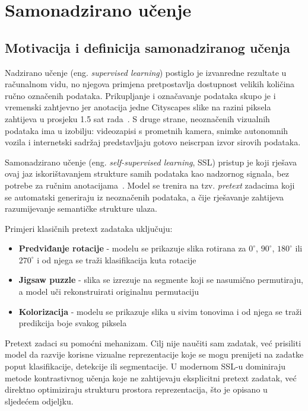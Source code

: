 \documentclass[diplomskirad]{fer}
\begin{document}
\section{Samonadzirano učenje}
\label{sec:ssl}

\subsection{Motivacija i definicija samonadziranog učenja}

Nadzirano učenje (eng. \textit{supervised learning}) postiglo je izvanredne rezultate u računalnom vidu, no njegova primjena pretpostavlja dostupnost velikih količina ručno označenih podataka. Prikupljanje i označavanje podataka skupo je i vremenski zahtjevno jer anotacija jedne Cityscapes slike na razini piksela zahtijeva u prosjeku 1.5 sat rada~\cite{cordts2016cityscapes}. S druge strane, neoznačenih vizualnih podataka ima u izobilju: videozapisi s prometnih kamera, snimke autonomnih vozila i internetski sadržaj predstavljaju gotovo neiscrpan izvor sirovih podataka.

Samonadzirano učenje (eng. \textit{self-supervised learning}, SSL) pristup je koji rješava ovaj jaz iskorištavanjem strukture samih podataka kao nadzornog signala, bez potrebe za ručnim anotacijama~\cite{goodfellow2016deep}. Model se trenira na tzv. \textit{pretext} zadacima koji se automatski generiraju iz neoznačenih podataka, a čije rješavanje zahtijeva razumijevanje semantičke strukture ulaza.

Primjeri klasičnih pretext zadataka uključuju:
\begin{itemize}
	\item \textbf{Predviđanje rotacije} - modelu se prikazuje slika rotirana za $0^{\circ}$, $90^{\circ}$, $180^{\circ}$ ili $270^{\circ}$ i od njega se traži klasifikacija kuta rotacije~\cite{goodfellow2016deep}
	\item \textbf{Jigsaw puzzle} - slika se izrezuje na segmente koji se nasumično permutiraju, a model uči rekonstruirati originalnu permutaciju
	\item \textbf{Kolorizacija} - modelu se prikazuje slika u sivim tonovima i od njega se traži predikcija boje svakog piksela
\end{itemize}

Pretext zadaci su pomoćni mehanizam. Cilj nije naučiti sam zadatak, već prisiliti model da razvije korisne vizualne reprezentacije koje se mogu prenijeti na zadatke poput klasifikacije, detekcije ili segmentacije. U modernom SSL-u dominiraju metode kontrastivnog učenja koje ne zahtijevaju eksplicitni pretext zadatak, već direktno optimiziraju strukturu prostora reprezentacija, što je opisano u sljedećem odjeljku.
\end{document}
